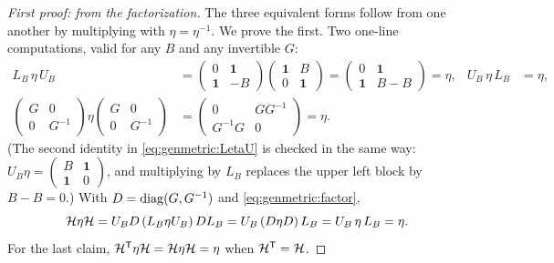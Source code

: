 \begin{proof}[First proof: from the factorization]
The three equivalent forms follow from one another by multiplying with
$\eta=\eta^{-1}$. We prove the first. Two one-line computations, valid for any $B$ and any
invertible $G$:
\begin{align}
 L_B\,\eta\,U_B&=\begin{pmatrix}0&\mathbf 1\\\mathbf 1&-B\end{pmatrix}
 \begin{pmatrix}\mathbf 1&B\\0&\mathbf 1\end{pmatrix}
 =\begin{pmatrix}0&\mathbf 1\\\mathbf 1&B-B\end{pmatrix}=\eta,
 &U_B\,\eta\,L_B&=\eta,\label{eq:genmetric:LetaU}\\
 \begin{pmatrix}G&0\\0&G^{-1}\end{pmatrix}\eta
 \begin{pmatrix}G&0\\0&G^{-1}\end{pmatrix}
 &=\begin{pmatrix}0&GG^{-1}\\G^{-1}G&0\end{pmatrix}=\eta .\label{eq:genmetric:DetaD}
\end{align}
(The second identity in \eqref{eq:genmetric:LetaU} is checked in the same way:
$U_B\eta=\left(\begin{smallmatrix}B&\mathbf 1\\\mathbf 1&0\end{smallmatrix}\right)$, and
multiplying by $L_B$ replaces the upper left block by $B-B=0$.) With
$D=\operatorname{diag}(G,G^{-1})$ and \eqref{eq:genmetric:factor},
\[
 \mathcal{H}\eta\mathcal{H}=U_BD\,(L_B\eta U_B)\,DL_B=U_B\,(D\eta D)\,L_B=U_B\,\eta\,L_B=\eta .
\]
For the last claim, $\mathcal{H}^{\mathsf T}\eta\mathcal{H}=\mathcal{H}\eta\mathcal{H}=\eta$ when $\mathcal{H}^{\mathsf T}=\mathcal{H}$.
\end{proof}

